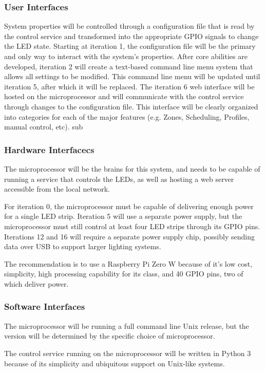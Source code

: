 \documentclass[onecolumn, draftclsnofoot,10pt, compsoc]{IEEEtran}
\begin{document}
					\subsubsection*{User Interfaces}
					System properties will be controlled through a configuration file that is read by the control service and transformed into the appropriate GPIO signals to change the LED state. Starting at
					 iteration 1, the configuration file will be the primary and only way to interact with the system’s properties. After core abilities are developed, iteration 2 will create a text-based command
					 line menu system that allows all settings to be modified. This command line menu will be updated until iteration 5, after which it will be replaced.
					The iteration 6 web interface will be hosted on the microprocessor and will communicate with the control service through changes to the configuration file. This interface will be clearly
					 organized into categories for each of the major features (e.g. Zones, Scheduling, Profiles, manual control, etc).
					 sub
					 \subsubsection{Hardware Interfacecs}
					 The microprocessor will be the brains for this system, and needs to be capable of running a service that controls the LEDs, as well as hosting a web server accessible from the local network.

					 	For iteration 0, the microprocessor must be capable of delivering enough power for a single LED strip. Iteration 5 will use a separate power supply, but the microprocessor must still control
						at least four LED strips through its GPIO pins. Iterations 12 and 16 will require a separate power supply chip, possibly sending data over USB to support larger lighting systems.

						The recommendation is to use a Raspberry Pi Zero W because of it’s low cost, simplicity, high processing capability for its class, and 40 GPIO pins, two of which deliver power.
						\subsubsection{Software Interfaces}
						The microprocessor will be running a full command line Unix release, but the version will be determined by the specific choice of microprocessor.

						The control service running on the microprocessor will be written in Python 3 because of its simplicity and ubiquitous support on Unix-like systems.
\end{document}
